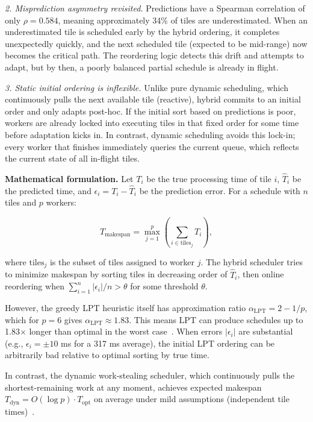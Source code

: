 \documentclass[acmsmall]{acmart}
\begin{document}
\noindent\textit{2. Misprediction asymmetry revisited.}
Predictions have a Spearman correlation of only $\rho = 0.584$, meaning approximately 34\% of tiles are underestimated. 
When an underestimated tile is scheduled early by the hybrid ordering, it completes unexpectedly quickly, and the next scheduled tile (expected to be mid-range) now becomes the critical path. 
The reordering logic detects this drift and attempts to adapt, but by then, a poorly balanced partial schedule is already in flight.

\noindent\textit{3. Static initial ordering is inflexible.}
Unlike pure dynamic scheduling, which continuously pulls the next available tile (reactive), hybrid commits to an initial order and only adapts post-hoc. 
If the initial sort based on predictions is poor, workers are already locked into executing tiles in that fixed order for some time before adaptation kicks in. 
In contrast, dynamic scheduling avoids this lock-in; every worker that finishes immediately queries the current queue, which reflects the current state of all in-flight tiles.

\textbf{Mathematical formulation.} 
Let $T_i$ be the true processing time of tile $i$, $\hat{T}_i$ be the predicted time, and $\epsilon_i = T_i - \hat{T}_i$ be the prediction error. 
For a schedule with $n$ tiles and $p$ workers:

\[
T_{\text{makespan}} = \max_{j=1}^{p} \left( \sum_{i \in \text{tiles}_j} T_i \right),
\]

where $\text{tiles}_j$ is the subset of tiles assigned to worker $j$. 
The hybrid scheduler tries to minimize makespan by sorting tiles in decreasing order of $\hat{T}_i$, then online reordering when 
$\sum_{i=1}^{n} |\epsilon_i| / n > \theta$ for some threshold $\theta$.

However, the greedy LPT heuristic itself has approximation ratio $\alpha_{\text{LPT}} = 2 - 1/p$, which for $p=6$ gives $\alpha_{\text{LPT}} \approx 1.83$. 
This means LPT can produce schedules up to 1.83$\times$ longer than optimal in the worst case~\cite{Graham1969}. 
When errors $|\epsilon_i|$ are substantial (e.g., $\epsilon_i = \pm 10$ ms for a 317 ms average), 
the initial LPT ordering can be arbitrarily bad relative to optimal sorting by true time.

In contrast, the dynamic work-stealing scheduler, which continuously pulls the shortest-remaining work at any moment, achieves expected makespan $T_{\text{dyn}} = O(\log p) \cdot T_{\text{opt}}$ on average under mild assumptions (independent tile times)~\cite{Blumofe1999}.
\end{document}
